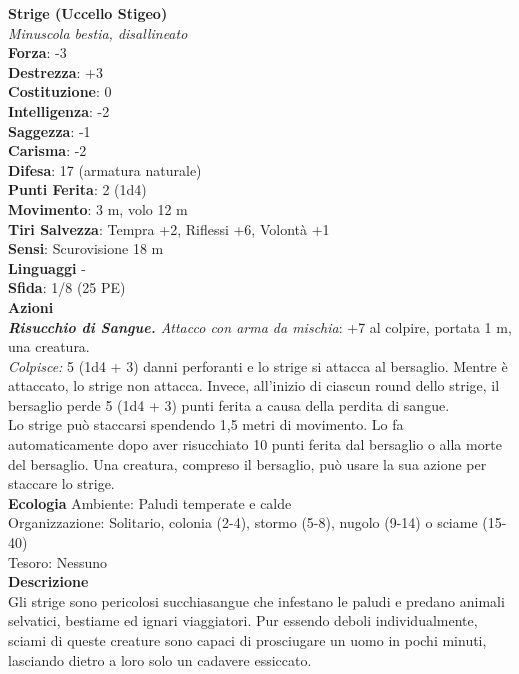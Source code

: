 \begin{multicols}{2}
\medskip\textbf{Strige (Uccello Stigeo)}\\
\emph{Minuscola bestia, disallineato}\\
\textbf{Forza}: -3\\
\textbf{Destrezza}: +3\\
\textbf{Costituzione}: 0\\
\textbf{Intelligenza}: -2\\
\textbf{Saggezza}: -1\\
\textbf{Carisma}: -2\\
\textbf{Difesa}: 17 (armatura naturale)\\
\textbf{Punti Ferita}: 2 (1d4)\\
\textbf{Movimento}: 3 m, volo 12 m\\
\textbf{Tiri Salvezza}: Tempra +2, Riflessi +6, Volontà +1\\
\textbf{Sensi}: Scurovisione 18 m\\
\textbf{Linguaggi} -\\
\textbf{Sfida}: 1/8 (25 PE)\smallskip\\
\smallskip\textbf{Azioni}\\
\emph{\textbf{Risucchio di Sangue.} Attacco con arma da mischia}: +7 al colpire, portata 1 m, una creatura.\\
\emph{Colpisce:} 5 (1d4 + 3) danni perforanti e lo strige si attacca al bersaglio. Mentre è attaccato, lo strige non attacca. Invece, all'inizio di ciascun round dello strige, il bersaglio perde 5 (1d4 + 3) punti ferita a causa della perdita di sangue.\\
Lo strige può staccarsi spendendo 1,5 metri di movimento. Lo fa automaticamente dopo aver risucchiato 10 punti ferita dal bersaglio o alla morte del bersaglio. Una creatura, compreso il bersaglio, può usare la sua azione per staccare lo strige.\\
\textbf{Ecologia}
Ambiente: Paludi temperate e calde\\
Organizzazione: Solitario, colonia (2-4), stormo (5-8), nugolo (9-14) o sciame (15-40)\\
Tesoro: Nessuno\\
\textbf{Descrizione}\\
Gli strige sono pericolosi succhiasangue che infestano le paludi e predano animali selvatici, bestiame ed ignari viaggiatori. Pur essendo deboli individualmente, sciami di queste creature sono capaci di prosciugare un uomo in pochi minuti, lasciando dietro a loro solo un cadavere essiccato.\\


\end{multicols}
